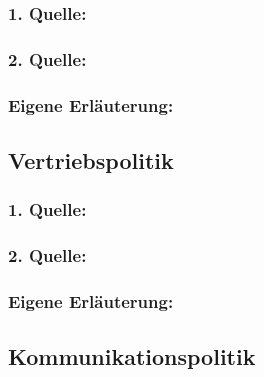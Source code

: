         \subsubsection*{1. Quelle:}
        \begin{abstract}
        \end{abstract}
        \subsubsection*{2. Quelle:}
        \begin{abstract}
        \end{abstract}
        \subsubsection*{Eigene Erläuterung:}
        \begin{abstract}
        \end{abstract}
    \subsection{Vertriebspolitik}
        \subsubsection*{1. Quelle:}
        \begin{abstract}
        \end{abstract}
        \subsubsection*{2. Quelle:}
        \begin{abstract}
        \end{abstract}
        \subsubsection*{Eigene Erläuterung:}
        \begin{abstract}
        \end{abstract}
    \subsection{Kommunikationspolitik}

